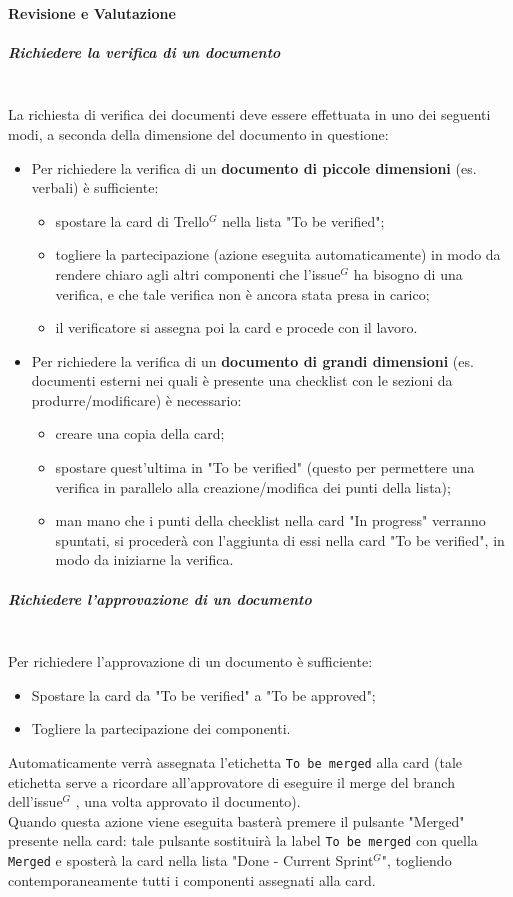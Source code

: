 \paragraph{Revisione e Valutazione}

\subparagraph{Richiedere la verifica di un documento}
\mbox{}\\
La richiesta di verifica dei documenti deve essere effettuata in uno dei seguenti modi,
a seconda della dimensione del documento in questione:
\begin{itemize}
    \item Per richiedere la verifica di un \textbf{documento di piccole dimensioni} (es. verbali) è sufficiente:
    \begin{itemize}
        \item spostare la card di Trello$^G$ nella lista "To be verified";
        \item togliere la partecipazione (azione eseguita automaticamente) in modo da rendere chiaro agli altri
        componenti che l'issue$^G$  ha bisogno di una verifica, e che tale verifica non è ancora stata presa in carico;
        \item il verificatore si assegna poi la card e procede con il lavoro.
    \end{itemize}
    \item Per richiedere la verifica di un \textbf{documento di grandi dimensioni} (es. documenti esterni nei quali è presente
    una checklist con le sezioni da produrre/modificare) è necessario:
    \begin{itemize}
        \item creare una copia della card;
        \item spostare quest'ultima in "To be verified" (questo per permettere una verifica in parallelo alla
        creazione/modifica dei punti della lista);
        \item man mano che i punti della checklist nella card "In progress" verranno spuntati, si procederà con
        l'aggiunta di essi nella card "To be verified", in modo da iniziarne la verifica.
    \end{itemize}
\end{itemize}

\subparagraph{Richiedere l'approvazione di un documento}
\mbox{}\\
Per richiedere l'approvazione di un documento è sufficiente:
\begin{itemize}
    \item Spostare la card da "To be verified" a "To be approved";
    \item Togliere la partecipazione dei componenti.
\end{itemize}
Automaticamente verrà assegnata l'etichetta \texttt{To be merged} alla card (tale etichetta serve a ricordare all'approvatore
di eseguire il merge del branch dell'issue$^G$ , una volta approvato il documento).\\
Quando questa azione viene eseguita basterà premere il pulsante "Merged" presente nella card: tale pulsante sostituirà la label
\texttt{To be merged} con quella \texttt{Merged} e sposterà la card nella lista "Done - Current Sprint$^G$", togliendo contemporaneamente tutti i
componenti assegnati alla card.

